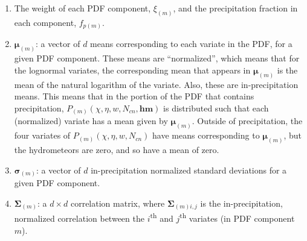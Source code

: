 \documentclass[11pt,fleqn]{article}
\begin{document}
\begin{enumerate}
\item The weight of each PDF component, $\xi_{(m)}$, and the precipitation
fraction in each component, $f_{p(m)}$.

\item $\bm{\mu}_{(m)}$: a vector of $d$ means corresponding to each variate in
the PDF, for a given PDF component. These means are ``normalized'', which means
that for the lognormal variates, the corresponding mean that appears in
$\bm{\mu}_{(m)}$ is the mean of the natural logarithm of the variate. Also,
these are in-precipitation means. This means that in the portion of the PDF that
contains precipitation, $P_{(m)}(\chi,\eta,w,N_{cn},\mathbf{hm})$ is distributed
such that each (normalized) variate has a mean given by $\bm{\mu}_{(m)}$.
Outside of precipitation, the four variates of $P_{(m)}(\chi,\eta,w,N_{cn})$
have means corresponding to $\bm{\mu}_{(m)}$, but the hydrometeors are zero, and
so have a mean of zero.

\item $\bm{\sigma}_{(m)}$: a vector of $d$ in-precipitation normalized standard
deviations for a given PDF component.

\item $\bm{\Sigma}_{(m)}$: a $d\times d$ correlation matrix, where
$\bm{\Sigma}_{(m)i,j}$ is the in-precipitation, normalized correlation between the
$i$\textsuperscript{th} and $j$\textsuperscript{th} variates (in PDF component
$m$).
\end{enumerate}
\end{document}
